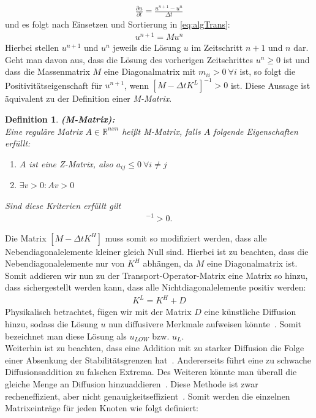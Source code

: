 \documentclass[a4paper,11pt]{article}
\newtheorem{defi}{Definition}[section]
\begin{document}
\begin{align}
 \frac{\partial u}{\partial t}=\frac{u^{n+1}-u^{n}}{\Delta t}
\end{align}
und es folgt nach Einsetzen und Sortierung in \eqref{eq:algTrans}:
\begin{align}
 [M-\Delta tK^H]u^{n+1}=Mu^n\label{eq:zeitschritt}
\end{align}
Hierbei stellen $u^{n+1}$ und $u^n$ jeweils die Lösung $u$ im Zeitschritt $n+1$  und $n$ dar.
Geht man davon aus, dass die Lösung des vorherigen Zeitschrittes $u^n\ge0$ ist und dass die Massenmatrix $M$ eine Diagonalmatrix mit $m_{ii}>0~\forall i$ ist, so folgt die Positivitätseigenschaft für $u^{n+1}$, wenn $[M-\Delta tK^L]^{-1}>0$ ist. Diese Aussage ist äquivalent zu der Definition einer \textit{M-Matrix}.
\begin{defi}\label{def:MMatrix}
 \textbf{(M-Matrix):}\\
Eine reguläre Matrix $A\in \mathbb{R}^{nxn}$ heißt M-Matrix, falls $A$ folgende Eigenschaften erfüllt:
\begin{enumerate}
 \item $A$ ist eine Z-Matrix, also $a_{ij}\le0~\forall i\neq j$
 \item $\exists v>0:Av>0$~\cite{fiedler2008special}
\end{enumerate}
Sind diese Kriterien erfüllt gilt
\begin{align*}
 [M-\Delta tK^L]^{-1}>0.
\end{align*}
\end{defi}
 Die Matrix $[M-\Delta tK^H]$ muss somit so modifiziert werden, dass alle Nebendiagonalelemente kleiner gleich Null sind. Hierbei ist zu beachten, dass die Nebendiagonalelemente nur von $K^H$ abhängen, da $M$ eine Diagonalmatrix ist. Somit addieren wir nun zu der Transport-Operator-Matrix eine Matrix so hinzu, dass sichergestellt werden kann, dass alle Nichtdiagonalelemente positiv werden:
\begin{align}
 K^L=K^H+D\label{eq:AddDif}
\end{align}
Physikalisch betrachtet, fügen wir mit der Matrix $D$ eine künstliche Diffusion hinzu, sodass die Lösung $u$ nun diffusivere Merkmale aufweisen könnte~\cite{kuzmin2002flux}. Somit bezeichnet man diese Lösung als $u_{LOW}$ bzw. $u_L$.\\
Weiterhin ist zu beachten, dass eine Addition mit zu starker Diffusion die Folge einer Absenkung der Stabilitätsgrenzen hat~\cite{kuzmin2002flux}. Andererseits führt eine zu schwache Diffusionsaddition zu falschen Extrema. Des Weiteren könnte man überall die gleiche Menge an Diffusion hinzuaddieren~\cite{kuzmin2002flux}. Diese Methode ist zwar recheneffizient, aber nicht genauigkeitseffizient~\cite{kuzmin2002flux}. Somit werden die einzelnen Matrixeinträge für jeden Knoten wie folgt definiert:
\end{document}
